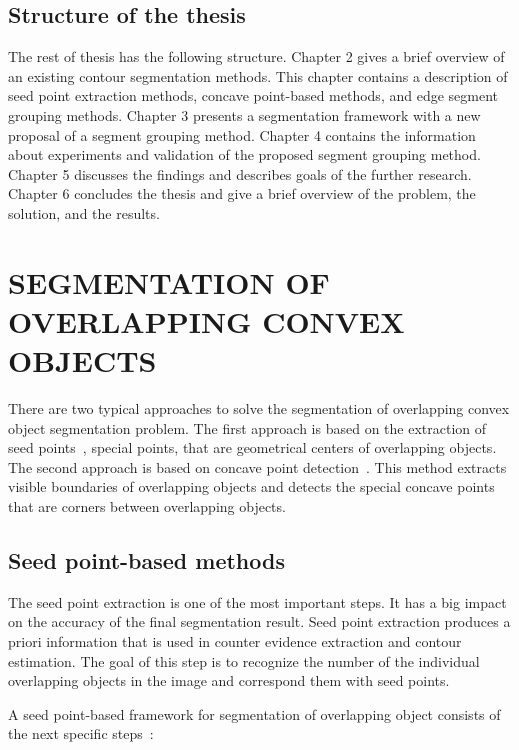 \documentclass{lutmscthesis}[2010/09/22]
\begin{document}
\subsection{Structure of the thesis}

The rest of thesis has the following structure. Chapter 2 gives a brief overview of an existing contour segmentation methods. This chapter contains a description of seed point extraction methods, concave point-based methods, and edge segment grouping methods. Chapter 3 presents a segmentation framework with a new proposal of a segment grouping method. Chapter 4 contains the information about experiments and validation of the proposed segment grouping method. Chapter 5 discusses the findings and describes goals of the further research. Chapter 6 concludes the thesis and give a brief overview of the problem, the solution, and the results.


\section{SEGMENTATION OF OVERLAPPING CONVEX OBJECTS}
\label{sec:related}

There are two typical approaches to solve the segmentation of overlapping convex object segmentation problem. The first approach is based on the extraction of seed points~\cite{zafari-thesis}, special points, that are geometrical centers of overlapping objects. The second approach is based on concave point detection~\cite{Zafari15}. This method extracts visible boundaries of overlapping objects and detects the special concave points that are corners between overlapping objects.  

\subsection{Seed point-based methods}

The seed point extraction is one of the most important steps. It has a big impact on the accuracy of the final segmentation result. Seed point extraction produces a priori information that is used in counter evidence extraction and contour estimation. The goal of this step is to recognize the number of the individual overlapping objects in the image and correspond them with seed points. 

A  seed point-based framework for segmentation of overlapping object consists of the next specific steps~\cite{zafari-thesis}:
\end{document}

